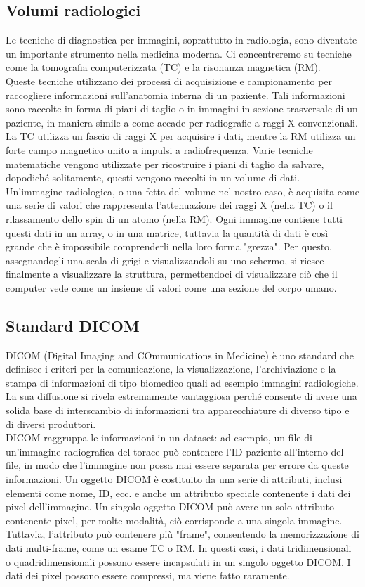 \subsection{Volumi radiologici}\label{sec:volumi-radiologici}
Le tecniche di diagnostica per immagini, soprattutto in radiologia, sono diventate un importante strumento nella medicina moderna. Ci concentreremo su tecniche come la tomografia computerizzata (TC) e la risonanza magnetica (RM).
\\
Queste tecniche utilizzano dei processi di acquisizione e campionamento per raccogliere informazioni sull'anatomia interna di un paziente. Tali informazioni sono raccolte in forma di piani di taglio o in immagini in sezione trasversale di un paziente, in maniera simile a come accade per radiografie a raggi X convenzionali. La TC utilizza un fascio di raggi X per acquisire i dati, mentre la RM utilizza un forte campo magnetico unito a  impulsi a radiofrequenza. Varie tecniche matematiche vengono utilizzate per ricostruire i piani di taglio da salvare, dopodiché solitamente, questi vengono raccolti in un volume di dati.
\\
Un'immagine radiologica, o una fetta del volume nel nostro caso, è acquisita come una serie di valori che rappresenta l'attenuazione dei raggi X (nella TC) o il rilassamento dello spin di un atomo (nella RM). Ogni immagine contiene tutti questi dati in un array, o in una matrice, tuttavia la quantità di dati è così grande che è impossibile comprenderli nella loro forma "grezza". Per questo, assegnandogli una scala di grigi e visualizzandoli su uno schermo, si riesce finalmente a visualizzare la struttura, permettendoci di visualizzare ciò che il computer vede come un insieme di valori come una sezione del corpo umano.

\subsection{Standard DICOM}
DICOM (Digital Imaging and COmmunications in Medicine) è uno standard che definisce i criteri per la comunicazione, la visualizzazione, l'archiviazione e la stampa di informazioni di tipo biomedico quali ad esempio immagini radiologiche. La sua diffusione si rivela estremamente vantaggiosa perché consente di avere una solida base di interscambio di informazioni tra apparecchiature di diverso tipo e di diversi produttori.
\\
DICOM raggruppa le informazioni in un dataset: ad esempio, un file di un'immagine radiografica del torace può contenere l'ID paziente all'interno del file, in modo che l'immagine non possa mai essere separata per errore da queste informazioni. Un oggetto DICOM è costituito da una serie di attributi, inclusi elementi come nome, ID, ecc. e anche un attributo speciale contenente i dati dei pixel dell'immagine. Un singolo oggetto DICOM può avere un solo attributo contenente pixel, per molte modalità, ciò corrisponde a una singola immagine. Tuttavia, l'attributo può contenere più "frame", consentendo la memorizzazione di dati multi-frame, come un esame TC o RM. In questi casi, i dati tridimensionali o quadridimensionali possono essere incapsulati in un singolo oggetto DICOM. I dati dei pixel possono essere compressi, ma viene fatto raramente.

